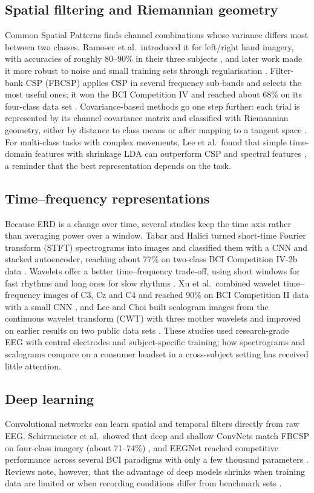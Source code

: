 \documentclass[pdflatex,sn-mathphys-num]{sn-jnl}%
\theoremstyle{thmstyleone}%
\theoremstyle{thmstyletwo}%
\theoremstyle{thmstylethree}%
\begin{document}
\subsection{Spatial filtering and Riemannian geometry}
Common Spatial Patterns finds channel combinations whose variance differs most between two classes. Ramoser et al.\ introduced it for left/right hand imagery, with accuracies of roughly 80--90\% in their three subjects \citep{Ramoser2000}, and later work made it more robust to noise and small training sets through regularisation \citep{Blankertz2008}. Filter-bank CSP (FBCSP) applies CSP in several frequency sub-bands and selects the most useful ones; it won the BCI Competition IV and reached about 68\% on its four-class data set \citep{Ang2012}. Covariance-based methods go one step further: each trial is represented by its channel covariance matrix and classified with Riemannian geometry, either by distance to class means or after mapping to a tangent space \citep{Barachant2012}. For multi-class tasks with complex movements, Lee et al.\ found that simple time-domain features with shrinkage LDA can outperform CSP and spectral features \citep{LeeSB2019}, a reminder that the best representation depends on the task.

\subsection{Time--frequency representations}
Because ERD is a change over time, several studies keep the time axis rather than averaging power over a window. Tabar and Halici turned short-time Fourier transform (STFT) spectrograms into images and classified them with a CNN and stacked autoencoder, reaching about 77\% on two-class BCI Competition IV-2b data \citep{Tabar2017}. Wavelets offer a better time--frequency trade-off, using short windows for fast rhythms and long ones for slow rhythms \citep{Torrence1998}. Xu et al.\ combined wavelet time--frequency images of C3, Cz and C4 and reached 90\% on BCI Competition II data with a small CNN \citep{Xu2019}, and Lee and Choi built scalogram images from the continuous wavelet transform (CWT) with three mother wavelets and improved on earlier results on two public data sets \citep{LeeChoi2019}. These studies used research-grade EEG with central electrodes and subject-specific training; how spectrograms and scalograms compare on a consumer headset in a cross-subject setting has received little attention.

\subsection{Deep learning}
Convolutional networks can learn spatial and temporal filters directly from raw EEG. Schirrmeister et al.\ showed that deep and shallow ConvNets match FBCSP on four-class imagery (about 71--74\%) \citep{Schirrmeister2017}, and EEGNet reached competitive performance across several BCI paradigms with only a few thousand parameters \citep{Lawhern2018}. Reviews note, however, that the advantage of deep models shrinks when training data are limited or when recording conditions differ from benchmark sets \citep{Roy2019}.
\end{document}
